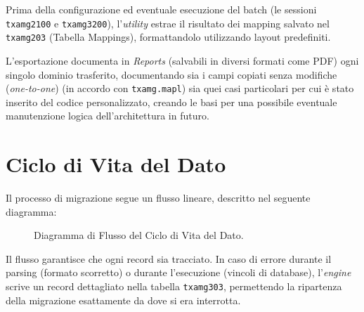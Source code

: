 Prima della configurazione ed eventuale esecuzione del batch (le sessioni
\texttt{txamg2100} e \texttt{txamg3200}), l'\textit{utility} estrae il risultato dei mapping salvato nel \texttt{txamg203} (Tabella Mappings),
formattandolo utilizzando layout predefiniti.

L'esportazione documenta in \textit{Reports} (salvabili in diversi formati come PDF) ogni singolo dominio trasferito, documentando sia
i campi copiati senza modifiche (\textit{one-to-one}) (in accordo con \texttt{txamg.mapl}) sia quei casi
particolari per cui è stato inserito del codice personalizzato, creando le basi per una possibile eventuale manutenzione logica dell'architettura in futuro.

\section{Ciclo di Vita del Dato}\label{sec:ciclo-di-vita-del-dato}
Il processo di migrazione segue un flusso lineare, descritto nel seguente diagramma:

\begin{figure}[H]
    \centering
    \caption{Diagramma di Flusso del Ciclo di Vita del Dato.}
    \label{fig:flowchart}
\end{figure}

Il flusso garantisce che ogni record sia tracciato.
In caso di errore durante il parsing (formato scorretto) o durante l'esecuzione (vincoli di database), l'\textit{engine}
scrive un record dettagliato nella tabella \texttt{txamg303}, permettendo la ripartenza della migrazione esattamente da
dove si era interrotta.
